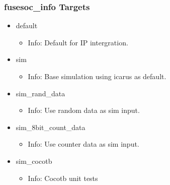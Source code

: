 \subsubsection{fusesoc\_info Targets}
\begin{itemize}
\item default
	\begin{itemize}
	\item[$\space$] Info: Default for IP intergration.
	\end{itemize}
\item sim
	\begin{itemize}
	\item[$\space$] Info: Base simulation using icarus as default.
	\end{itemize}
\item sim\_rand\_data
	\begin{itemize}
	\item[$\space$] Info: Use random data as sim input.
	\end{itemize}
\item sim\_8bit\_count\_data
	\begin{itemize}
	\item[$\space$] Info: Use counter data as sim input.
	\end{itemize}
\item sim\_cocotb
	\begin{itemize}
	\item[$\space$] Info: Cocotb unit tests
	\end{itemize}
\end{itemize}
